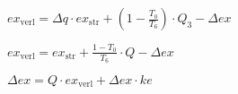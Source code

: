 \( ex_{\text{verl}} = \Delta q \cdot ex_{\text{str}} + \left( 1 - \frac{T_0}{T_6} \right) \cdot Q_3 - \Delta ex \)  

\( ex_{\text{verl}} = ex_{\text{str}} + \frac{1 - T_0}{T_6} \cdot Q - \Delta ex \)  

\( \Delta ex = Q \cdot ex_{\text{verl}} + \Delta ex \cdot ke \)